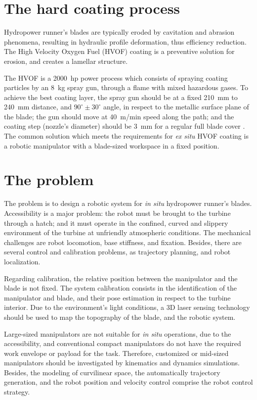 \section{The hard coating process}\label{hvof}

Hydropower runner's blades are typically eroded by cavitation and abrasion
phenomena, resulting in hydraulic profile deformation, thus efficiency
reduction. The High Velocity Oxygen Fuel (HVOF) coating is a preventive
solution for erosion, and creates a lamellar structure. 

The HVOF is a 2000~hp power process which consists of
spraying coating particles by an 8~kg spray gun, through a flame with mixed
hazardous gases. To achieve the best coating layer, the spray gun should be at
a fixed 210~mm to 240~mm distance, and $90^\circ \pm 30^\circ$ angle, in respect
to the metallic surface plane of the blade; the gun should move at 40~m/min
speed along the path; and the coating step (nozzle's diameter) should be 3~mm
for a regular full blade cover \cite{li2002effect}. The
common solution which meets the requirements for \textit{ex situ} HVOF coating
is a robotic manipulator with a blade-sized workspace in a fixed position.

\section{The problem}\label{problem}

The problem is to design a robotic system for \textit{in situ}
hydropower runner's blades. Accessibility is a major problem: the robot must be
brought to the turbine through a hatch; and it must operate in the confined,
curved and slippery environment of the turbine at unfriendly atmospheric
conditions. The mechanical challenges are robot locomotion, base stiffness, and
fixation. Besides, there are several control and calibration problems, as
trajectory planning, and robot localization.

Regarding calibration, the relative position between the manipulator and the
blade is not fixed. The system calibration consists in the identification of
the manipulator and blade, and their pose estimation in respect to the turbine
interior. Due to the environment's light conditions, a 3D laser sensing
technology should be used to map the topography of the blade, and the robotic
system. 

Large-sized manipulators are not suitable for \textit{in situ} operations, due
to the accessibility, and conventional compact manipulators do not
have the required work envelope or payload for the task. Therefore,
customized or mid-sized manipulators should be investigated by kinematics and
dynamics simulations. Besides, the modeling of curvilinear space,
the automatically trajectory generation, and the robot position and velocity
control comprise the robot control strategy.


